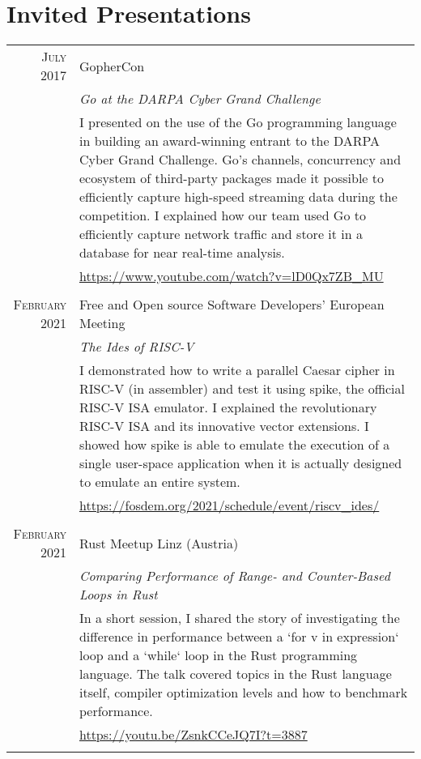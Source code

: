\documentclass[a4paper,10pt]{article} %
\begin{document}
\section{Invited Presentations}
\begin{tabular}{r|p{11cm}}

\textsc{July 2017} & GopherCon \\
& \emph{Go at the DARPA Cyber Grand Challenge}\\
& \footnotesize{I presented on the use of the Go programming language in building an award-winning entrant to the DARPA Cyber Grand Challenge. Go's channels, concurrency and ecosystem of third-party packages made it possible to efficiently capture high-speed streaming data during the competition. I explained how our team used Go to efficiently capture network traffic and store it in a database for near real-time analysis.}\\
& \url{https://www.youtube.com/watch?v=lD0Qx7ZB_MU} \\
\multicolumn{2}{c}{ } \\


\textsc{February 2021} & Free and Open source Software Developers' European Meeting \\
& \emph{The Ides of RISC-V}\\
& \footnotesize{I demonstrated how to write a parallel Caesar cipher in RISC-V (in assembler) and test it using spike, the official RISC-V ISA emulator. I explained the revolutionary RISC-V ISA and its innovative vector extensions. I showed how spike is able to emulate the execution of a single user-space application when it is actually designed to emulate an entire system.}\\
& \url{https://fosdem.org/2021/schedule/event/riscv_ides/} \\
\multicolumn{2}{c}{ } \\

\textsc{February 2021} &  Rust Meetup Linz (Austria) \\
& \emph{Comparing Performance of Range- and Counter-Based Loops in Rust}\\
& \footnotesize{In a short session, I shared the story of investigating the difference in performance between a `for v in expression` loop and a `while` loop in the Rust programming language. The talk covered topics in the Rust language itself, compiler optimization levels and how to benchmark performance.}\\
& \url{https://youtu.be/ZsnkCCeJQ7I?t=3887} \\
\multicolumn{2}{c}{ } \\

\end{tabular}
\end{document}
